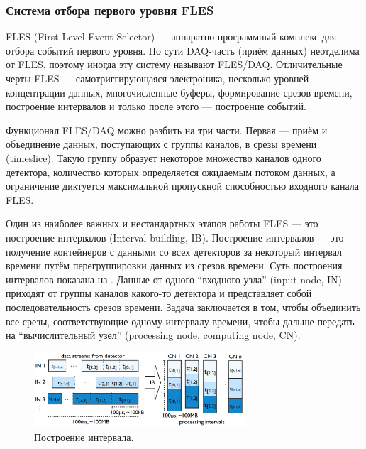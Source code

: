 \subsubsection{Система отбора первого уровня FLES}\label{sec:secFLES}

\bigskip

FLES (First Level Event Selector) --- аппаратно-программный комплекс для отбора событий первого уровня. По сути DAQ-часть (приём данных) неотделима от FLES, поэтому иногда эту систему называют FLES/DAQ.
Отличительные черты FLES --- самотриггирующаяся электроника, несколько уровней концентрации данных, многочисленные буферы, формирование срезов времени, построение интервалов и только после этого --- построение событий.

Функционал FLES/DAQ можно разбить на три части. Первая --- приём и объединение данных, поступающих с группы каналов, в срезы времени (timeslice). Такую группу образует некоторое множество каналов одного детектора, количество которых определяется ожидаемым потоком данных, а ограничение диктуется максимальной пропускной способностью входного канала FLES.

Один из наиболее важных и нестандартных этапов работы FLES --- это построение интервалов (Interval building, IB). Построение интервалов --- это получение контейнеров с данными со всех детекторов за некоторый интервал времени путём перегруппировки данных из срезов времени. Суть построения интервалов показана на . Данные от одного ``входного узла'' (input node, IN) приходят от группы каналов какого-то детектора и представляет собой последовательность срезов времени. Задача заключается в том, чтобы объединить все срезы, соответствующие одному интервалу времени, чтобы дальше передать на ``вычислительный узел'' (processing node, computing node, CN).

\begin{figure}[H]
\centering
\includegraphics[width=0.7\textwidth]{pictures/Interval_building.png}
\caption{Построение интервала.}
\label{fig:IntervalBuilding}
\end{figure}

